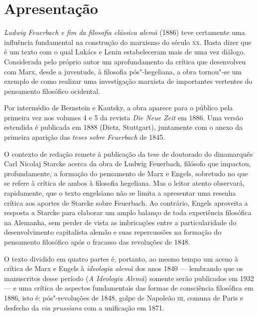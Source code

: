 \pagebreak
\thispagestyle{empty}
\movetooddpage
\chapter{Apresentação}


\noindent{}\emph{Ludwig Feuerbach e fim da filosofia clássica alemã} (1886) teve
certamente uma influência fundamental na construção do marxismo do
século \textsc{xx}. Basta dizer que é um texto com o qual Lukács e Lenin
estabeleceram mais de uma vez diálogo. Considerada pelo próprio autor um
aprofundamento da crítica que desenvolveu com Marx, desde a juventude, à
filosofia pós"-hegeliana, a obra tornou"-se um exemplo de como realizar
uma investigação marxista de importantes vertentes do pensamento
filosófico ocidental.

Por intermédio de Bernstein e Kautsky, a obra aparece para o público
pela primeira vez nos volumes 4 e 5 da revista \emph{Die Neue Zeit} em
1886. Uma versão estendida é publicada em 1888 (Dietz, Stuttgart),
juntamente com o anexo da primeira aparição das \emph{teses sobre
Feuerbach} de 1845.

O contexto de redação remete à publicação da tese de doutorado do
dinamarquês Carl Nicolaj Starcke acerca da obra de Ludwig Feuerbach,
filósofo que impactou, profundamente, a formação do pensamento de Marx e
Engels, sobretudo no que se refere à crítica de ambos à filosofia
hegeliana. Mas o leitor atento observará, rapidamente, que o texto
engelsiano não se limita a apresentar uma resenha crítica aos aportes de
Starcke sobre Feuerbach. Ao contrário, Engels aproveita a resposta a
Starcke para elaborar um amplo balanço de toda experiência filosófica na
Alemanha, sem perder de vista as imbricações entre a particularidade do
desenvolvimento capitalista alemão e suas repercussões na formação do
pensamento filosófico após o fracasso das revoluções de 1848.

O texto dividido em quatro partes é, portanto, ao mesmo tempo um aceno à
crítica de Marx e Engels à \emph{ideologia alemã} dos anos 1840 ---
lembrando que os manuscritos desse período (\emph{A Ideologia
Alemã}) somente serão publicados em 1932 --- e uma crítica de aspectos
fundamentais das formas de consciência filosófica em 1886, isto é:
pós"-revoluções de 1848, golpe de Napoleão \textsc{iii}, comuna de Paris e
desfecho da \emph{via prussiana} com a unificação em 1871.

